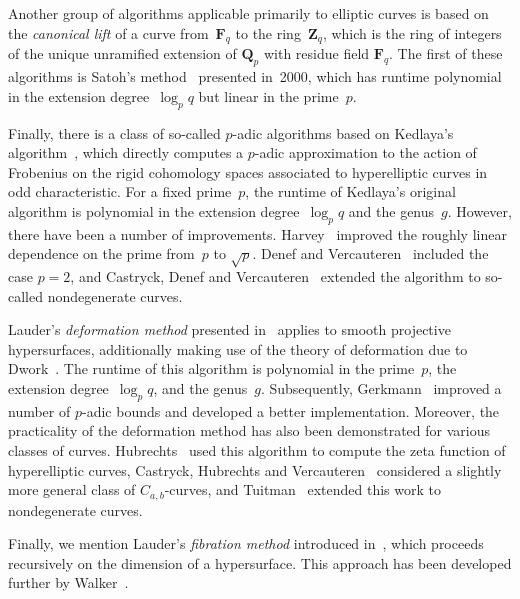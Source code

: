 Another group of algorithms applicable primarily to elliptic curves 
is based on the \emph{canonical lift} of a curve from~$\mathbf{F}_{q}$ 
to the ring~$\mathbf{Z}_{q}$, which is the ring of integers of the 
unique unramified extension of $\mathbf{Q}_{p}$ with residue field 
$\mathbf{F}_{q}$.  The first of these algorithms is Satoh's 
method~\citep{Satoh2000} presented in~2000, which has runtime 
polynomial in the extension degree~$\log_{p} q$ but linear in the prime~$p$.

Finally, there is a class of so-called $p$-adic algorithms based on 
Kedlaya's algorithm~\citep{Kedlaya2001}, which directly computes a 
$p$-adic approximation to the action of Frobenius on the rigid cohomology 
spaces associated to hyperelliptic curves in odd characteristic.  
For a fixed prime~$p$, the runtime of Kedlaya's original algorithm 
is polynomial in the extension degree~$\log_{p} q$ and the genus~$g$.  
However, there have been a number of improvements.  Harvey~\citep{Harvey2007} 
improved the roughly linear dependence on the prime from~$p$ to $\sqrt{p}$.  
Denef and Vercauteren~\citep{DenVer2006} included the case $p = 2$, and 
Castryck, Denef and Vercauteren~\citep{CasDenVer2006} extended the algorithm 
to so-called nondegenerate curves.

Lauder's \emph{deformation method} presented in~\citep{Lau04a} 
applies to smooth projective hypersurfaces, additionally making use 
of the theory of deformation due to Dwork~\citep{Dwork62b}.  The 
runtime of this algorithm is polynomial in the prime~$p$, the 
extension degree~$\log_{p} q$, and the genus~$g$.  Subsequently, 
Gerkmann~\citep{Gerkmann2007} improved a number of $p$-adic bounds 
and developed a better implementation.  Moreover, the practicality 
of the deformation method has also been demonstrated for various 
classes of curves.  Hubrechts~\citep{Hubrechts2007, Hubrechts2008} 
used this algorithm to compute the zeta function of hyperelliptic curves, 
Castryck, Hubrechts and Vercauteren~\citep{CasHubVer2008} considered 
a slightly more general class of $C_{a,b}$-curves, and 
Tuitman~\citep{Tuitman2011} extended this work to nondegenerate curves. 

Finally, we mention Lauder's \emph{fibration method} introduced 
in~\citep{Lauder2006}, which proceeds recursively on the dimension 
of a hypersurface.  This approach has been developed further 
by Walker~\citep{Walker2009}.


